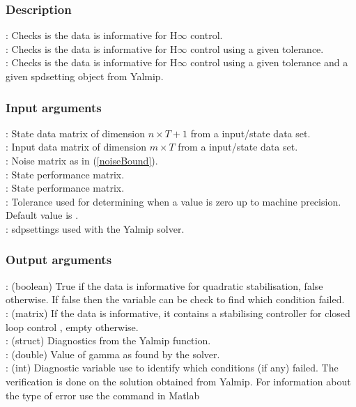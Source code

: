 \subsubsection*{Description}
\mon{[[bool, K, diagnostics, gamma, info] = isInformHInf(X, U, Phi, C, D)}: Checks is the data is informative for \mbox{H$\infty$} control. \\
: Checks is the data is informative for \mbox{H$\infty$} control using a given tolerance. \\
: Checks is the data is informative for \mbox{H$\infty$} control using a given tolerance and a given spdsetting object from Yalmip.

\subsubsection*{Input arguments}
\textbf{}: State data matrix of dimension $n \times T+1$ from a input/state data set.\\
\textbf{}: Input data matrix of dimension $m \times T$ from a input/state data set.\\
\textbf{}: Noise matrix as in (\ref{noiseBound}). \\ 
\textbf{}: State performance matrix. \\ 
\textbf{}: State performance matrix. \\ 
\textbf{}: Tolerance used for determining when a value is zero up to machine precision. Default value is .\\
\textbf{}: sdpsettings used with the Yalmip solver.

\subsubsection*{Output arguments}
\textbf{}: (boolean) True if the data is informative for quadratic stabilisation, false otherwise. If false then the  variable can be check to find which condition failed. \\
\textbf{}: (matrix) If the data is informative, it contains a stabilising controller  for closed loop control , empty otherwise.\\
\textbf{}: (struct) Diagnostics from the Yalmip  function. \\
\textbf{}: (double) Value of gamma as found by the solver. \\
\textbf{}: (int) Diagnostic variable use to identify which conditions (if any) failed. The verification is done on the solution obtained from Yalmip. For information about the type of error use the  command in Matlab


